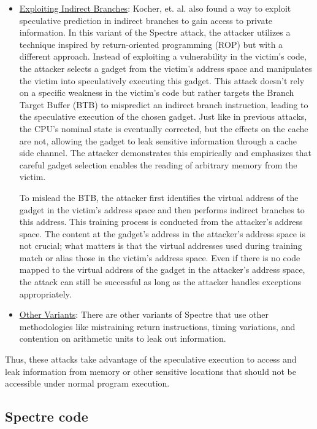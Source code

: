 \documentclass[twocolumn,showpacs,%
  nofootinbib,aps,superscriptaddress,%
  eqsecnum,prd,notitlepage,showkeys,10pt]{revtex4-1}
\begin{document}
\begin{itemize}
\item \underline{Exploiting Indirect Branches}: Kocher, et. al. also found a way to exploit speculative prediction in indirect branches to gain access to private information\cite{kocher2020spectre}. In this variant of the Spectre attack, the attacker utilizes a technique inspired by return-oriented programming (ROP) but with a different approach. Instead of exploiting a vulnerability in the victim's code, the attacker selects a gadget from the victim's address space and manipulates the victim into speculatively executing this gadget. This attack doesn't rely on a specific weakness in the victim's code but rather targets the Branch Target Buffer (BTB) to mispredict an indirect branch instruction, leading to the speculative execution of the chosen gadget. Just like in previous attacks, the CPU's nominal state is eventually corrected, but the effects on the cache are not, allowing the gadget to leak sensitive information through a cache side channel. The attacker demonstrates this empirically and emphasizes that careful gadget selection enables the reading of arbitrary memory from the victim.

To mislead the BTB, the attacker first identifies the virtual address of the gadget in the victim's address space and then performs indirect branches to this address. This training process is conducted from the attacker's address space. The content at the gadget's address in the attacker's address space is not crucial; what matters is that the virtual addresses used during training match or alias those in the victim's address space. Even if there is no code mapped to the virtual address of the gadget in the attacker's address space, the attack can still be successful as long as the attacker handles exceptions appropriately.

\item \underline{Other Variants}: There are other variants of Spectre that use other methodologies like mistraining return instructions, timing variations, and contention on arithmetic units to leak out information.\cite{kocher2020spectre}
\end{itemize}

Thus, these attacks take advantage of the speculative execution to access and leak information from memory or other sensitive locations that should not be accessible under normal program execution.

\subsection{Spectre code}
\end{document}
